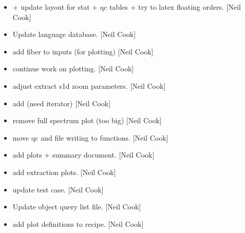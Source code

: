 \documentclass[a4paper,10pt,english]{report}
\begin{document}
\label{\detokenize{misc/changelog:id70}}\begin{itemize}
\item {} 
 +  \sphinxhyphen{} update layout for stat + qc tables + try
to latex floating orders. {[}Neil Cook{]}

\item {} 
Update language database. {[}Neil Cook{]}

\item {} 
 \sphinxhyphen{} add fiber to  inputs (for
plotting) {[}Neil Cook{]}

\item {} 
 \sphinxhyphen{} continue work on plotting. {[}Neil Cook{]}

\item {} 
 \sphinxhyphen{} adjust extract s1d zoom
parameters. {[}Neil Cook{]}

\item {} 
 \sphinxhyphen{} add  (need iterator)
{[}Neil Cook{]}

\item {} 
 \sphinxhyphen{} remove full spectrum plot (too big) {[}Neil
Cook{]}

\item {} 
 \sphinxhyphen{} move qc and file writing to functions.
{[}Neil Cook{]}

\item {} 
 \sphinxhyphen{} add plots + summary document. {[}Neil Cook{]}

\item {} 
 \sphinxhyphen{} add extraction plots. {[}Neil Cook{]}

\item {} 
 \sphinxhyphen{} update test case. {[}Neil Cook{]}

\item {} 
Update object query list file. {[}Neil Cook{]}

\item {} 
 \sphinxhyphen{} add plot definitions
to recipe. {[}Neil Cook{]}


\end{itemize}
\end{document}
